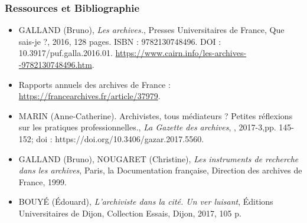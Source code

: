 \documentclass[xcolor=table]{beamer}
\begin{document}
\begin{frame}[plain]
\frametitle{Ressources et Bibliographie}
\begin{itemize}
    \item GALLAND (Bruno), \textit{Les archives.}, Presses Universitaires de France, \og Que sais-je ?\fg{}, 2016, 128 pages. ISBN : 9782130748496. DOI : 10.3917/puf.galla.2016.01. \url{https://www.cairn.info/les-archives--9782130748496.htm}.
    \item Rapports annuels des archives de France : \url{https://francearchives.fr/article/37979}. 
    \item MARIN (Anne-Catherine). \og Archivistes, tous m\'ediateurs ? Petites r\'eflexions sur les pratiques professionnelles.\fg{}, \textit{La Gazette des archives}, , 2017-3,pp. 145-152; doi : https://doi.org/10.3406/gazar.2017.5560.
    \item GALLAND (Bruno), NOUGARET (Christine), \textit{Les instruments de recherche dans les archives}, Paris, la Documentation fran\c caise, Direction des archives de France, 1999.
    \item BOUY\'E (\'Edouard), \textit{L'archiviste dans la cit\'e. Un ver luisant}, \'Editions Universitaires de Dijon, Collection Essais, Dijon, 2017, 105 p.
\end{itemize}
\end{frame}
\end{document}
